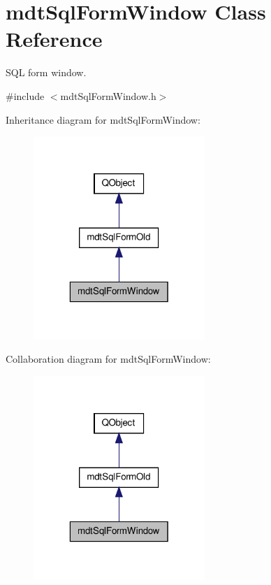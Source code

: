 \hypertarget{classmdt_sql_form_window}{\section{mdt\-Sql\-Form\-Window Class Reference}
\label{classmdt_sql_form_window}
}


S\-Q\-L form window.  




{\ttfamily \#include $<$mdt\-Sql\-Form\-Window.\-h$>$}



Inheritance diagram for mdt\-Sql\-Form\-Window\-:\nopagebreak
\begin{figure}[H]
\begin{center}
\leavevmode
\includegraphics[width=184pt]{classmdt_sql_form_window__inherit__graph}
\end{center}
\end{figure}


Collaboration diagram for mdt\-Sql\-Form\-Window\-:\nopagebreak
\begin{figure}[H]
\begin{center}
\leavevmode
\includegraphics[width=184pt]{classmdt_sql_form_window__coll__graph}
\end{center}
\end{figure}
